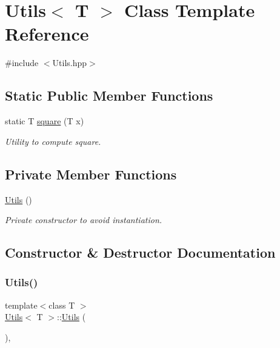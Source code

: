 \hypertarget{classUtils}{}\section{Utils$<$ T $>$ Class Template Reference}
\label{classUtils}


{\ttfamily \#include $<$Utils.\+hpp$>$}

\subsection*{Static Public Member Functions}
\begin{DoxyCompactItemize}
\item 
static T \mbox{\hyperlink{classUtils_abfc983311119a5d69174d8c082c00411}{square}} (T x)
\begin{DoxyCompactList}\small\item\em Utility to compute square. \end{DoxyCompactList}\end{DoxyCompactItemize}
\subsection*{Private Member Functions}
\begin{DoxyCompactItemize}
\item 
\mbox{\hyperlink{classUtils_a62be9758b5598de1e77dcd41691fba48}{Utils}} ()
\begin{DoxyCompactList}\small\item\em Private constructor to avoid instantiation. \end{DoxyCompactList}\end{DoxyCompactItemize}


\subsection{Constructor \& Destructor Documentation}
\mbox{\label{classUtils_a62be9758b5598de1e77dcd41691fba48}} 
\subsubsection{\texorpdfstring{Utils()}{Utils()}}
{\footnotesize\ttfamily template$<$class T $>$ \\
\mbox{\hyperlink{classUtils}{Utils}}$<$ T $>$\+::\mbox{\hyperlink{classUtils}{Utils}} (\begin{DoxyParamCaption}{ }\end{DoxyParamCaption})\hspace{0.3cm}{\ttfamily [inline]}, {\ttfamily [private]}}



